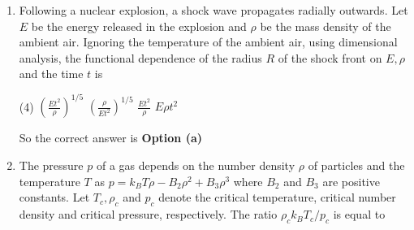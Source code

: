 \begin{enumerate}
 \begin{tasks}(2)
	\task[\textbf{a.}]Both stable
	\task[\textbf{b.}] Both unstable
	\task[\textbf{c.}] Unstable and stable, respectively
	\task[\textbf{d.}] Stable and unstable, respectively
\end{tasks}
\begin{answer}$\left. \right. $
	\begin{figure}[H]
		\centering
		\texttt{[image: Net-D-19-40]}
	\end{figure}
	\begin{align*}
	y_{n+1}&=1-2 y_{t}^{2}\\
	\text { For fixed point } y_{n+1}&=y_{n}\\
	y_{n}&=1-2 y_{n}^{2} \\
	2 y_{n}^{2}&+y_{n}-1=0 \\
	y_{n}^{2}&+\frac{1}{2} y_{n}-\frac{1}{2}=0 \\
	y_{n}&=-1,0.5 \\
	f&=y_{n}=1-2 y_{n}^{2}\\
	\frac{\partial f}{\partial y}&=-4 y \quad y=-1 \\
	\frac{\partial f}{\partial y}&=4 \rightarrow|4|>1\quad\text{unstable}\\
	y&=0.5 \qquad \frac{\partial f}{\partial y}=-2\qquad  |-2|>1 \text { unstable }
	\end{align*}
		So the correct answer is \textbf{Option (b)}
\end{answer}
\item Following a nuclear explosion, a shock wave propagates radially outwards. Let $E$ be the energy released in the explosion and $\rho$ be the mass density of the ambient air. Ignoring the temperature of the ambient air, using dimensional analysis, the functional dependence of the radius $R$ of the shock front on $E, \rho$ and the time $t$ is
 \begin{tasks}(4)
	\task[\textbf{a.}]$\left(\frac{E t^{2}}{\rho}\right)^{1 / 5}$
	\task[\textbf{b.}]$\left(\frac{\rho}{E t^{2}}\right)^{1 / 5}$
	\task[\textbf{c.}]$\frac{E t^{2}}{\rho}$
	\task[\textbf{d.}] $E \rho t^{2}$
\end{tasks}
\begin{answer}
	So the correct answer is \textbf{Option (a)}
\end{answer}
\item The pressure $p$ of a gas depends on the number density $\rho$ of particles and the temperature $T$ as $p=k_{B} T \rho-B_{2} \rho^{2}+B_{3} \rho^{3}$ where $B_{2}$ and $B_{3}$ are positive constants. Let $T_{c}, \rho_{c}$ and $p_{c}$ denote the critical temperature, critical number density and critical pressure, respectively. The ratio $\rho_{c} k_{B} T_{c} / p_{c}$ is equal to

\end{enumerate}
